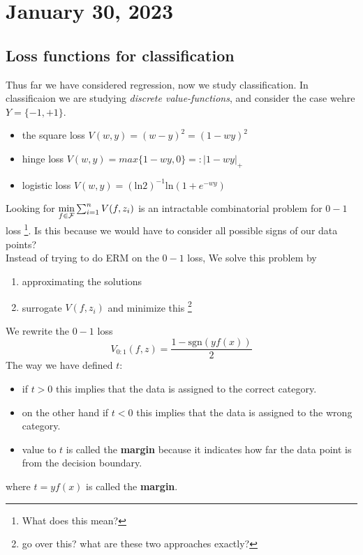 \newpage
\section{January 30, 2023}
\subsection{Loss functions for classification}
 Thus far we have considered regression, now we study classification. In classificaion we are studying \textit{discrete value-functions}, and consider the case wehre $Y = \{-1, +1 \}$.
\begin{itemize}
    \item the square loss $V(w,y) = (w-y)^2 = (1-wy)^2$
    \item hinge loss $V(w,y) = max\{1-wy,0\} =: |1-wy|_{+}$
    \item logistic loss $V(w,y) = (\text{ln}2)^{-1}\text{ln}(1+e^{-wy})$
\end{itemize}
Looking for $\underset{f \in \mathcal F}{\text{min}} \sum_{i=1}^{n} V(f,z_i)$ is an intractable combinatorial problem for $0-1$ loss \footnote{What does this mean?}. Is this because we would have to consider all possible signs of our data points? 
\\ 
Instead of trying to do ERM on the $0-1$ loss, 
We solve this problem by 
\begin{enumerate}
    \item approximating the solutions
    \item surrogate $V(f,z_i)$ and minimize this \footnote{go over this? what are these two approaches exactly?}
\end{enumerate}
We rewrite the $0-1$ loss
$$
V_{0:1}(f,z) = \frac{1-\text{sgn}(yf(x))}{2} 
$$
The way we have defined $t$:
\begin{itemize}
    \item if $t > 0$ this implies that the data is assigned to the correct category.
    \item on the other hand if $t < 0$ this implies that the data is assigned to the wrong category.
    \item value to $t$ is called the \textbf{margin} because it indicates how far the data point is from the decision boundary.

\end{itemize}
where $t= yf(x)$ is called the \textbf{margin}.
